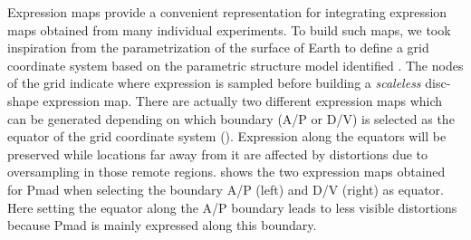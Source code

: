 Expression maps provide a convenient representation for integrating expression maps obtained from many individual experiments. To build such maps, we took inspiration from the parametrization of the surface of Earth to define a grid coordinate system based on the parametric structure model identified \autocite{schaffter2013}. The nodes of the grid indicate where expression is sampled before building a \emph{scaleless} disc-shape expression map. There are actually two different expression maps which can be generated depending on which boundary (A/P or D/V) is selected as the equator of the grid coordinate system (). Expression along the equators will be preserved while locations far away from it are affected by distortions due to oversampling in those remote regions.  shows the two expression maps obtained for Pmad when selecting the boundary A/P (left) and D/V (right) as equator. Here setting the equator along the A/P boundary leads to less visible distortions because Pmad is mainly expressed along this boundary.\\

